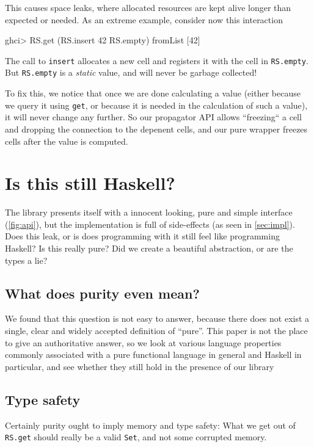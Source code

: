 \documentclass[manuscript,anonymous,screen,acmsmall]{acmart}
\begin{document}
This causes space leaks, where allocated resources are kept alive longer than expected or needed. As an extreme example, consider now this interaction
\begin{code}
ghci> RS.get (RS.insert 42 RS.empty)
fromList [42]
\end{code}
The call to \verb|insert| allocates a new cell and registers it with the cell in \verb|RS.empty|. But \verb|RS.empty| is a \emph{static} value, and will never be garbage collected!

To fix this, we notice that once we are done calculating a value (either because we query it using \verb|get|, or because it is needed in the calculation of such a value), it will never change any further. So our propagator API allows “freezing“ a cell and dropping the connection to the depenent cells, and our pure wrapper freezes cells after the value is computed.

\section{Is this still Haskell?}\label{sec:pure}

The library presents itself with a innocent looking, pure and simple interface (\cref{fig:api}), but the implementation is full of side-effects (as seen in \cref{sec:impl}).
Does this leak, or is does programming with it still feel like programming Haskell?
Is this really pure? Did we create a beautiful abstraction, or are the types a lie?

\subsection{What does purity even mean?}

We found that this question is not easy to answer, because there does not exist a single, clear and widely accepted definition of “pure”.
This paper is not the place to give an authoritative answer, so we look at various language properties commonly associated with a pure functional language in general and Haskell in particular,
and see whether they still hold in the presence of our library

\subsection{Type safety}

Certainly purity ought to imply memory and type safety: What we get out of \verb|RS.get| should really be a valid \verb|Set|, and not some corrupted memory.
\end{document}

